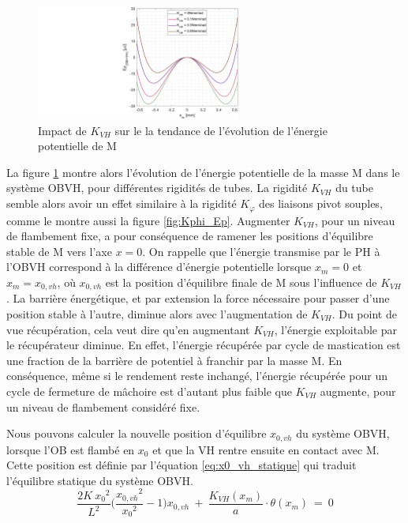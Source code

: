 \begin{figure}[!htb]
	\begin{center}
		\captionsetup{justification=centering}
		\includegraphics[trim={14cm 0cm 0cm 0cm},clip,width=0.6\textwidth]{../Chap5/Figure/(Ep)_vs_(x_m)_avec_plusieurs_K_VH.pdf}
		\caption{Impact de $K_{VH}$ sur le la tendance de l'évolution de l'énergie potentielle de M}
		\label{fig:(Ep)_vs_(x_m)_avec_plusieurs_K_VH}
	\end{center}
\end{figure}  
La figure \ref{fig:(Ep)_vs_(x_m)_avec_plusieurs_K_VH} montre alors l'évolution de l'énergie potentielle de la masse M dans le système OBVH, pour différentes rigidités de tubes. La rigidité $K_{VH}$ du tube semble alors avoir un effet similaire à la rigidité $K_{\varphi}$ des liaisons pivot souples, comme le montre aussi la figure \ref{fig:Kphi_Ep}. Augmenter $K_{VH}$, pour un niveau de flambement fixe, a pour conséquence de ramener les positions d'équilibre stable de M vers l'axe $x=0$. On rappelle que l'énergie transmise par le PH à l'OBVH correspond à la différence d'énergie potentielle lorsque $x_m=0$ et $x_m=x_{0,vh}$, où $x_{0,vh}$ est la position d'équilibre finale de M sous l'influence de $K_{VH}$. La barrière énergétique, et par extension la force nécessaire pour passer d'une position stable à l'autre, diminue alors avec l'augmentation de $K_{VH}$. Du point de vue récupération, cela veut dire qu'en augmentant $K_{VH}$, l'énergie exploitable par le récupérateur diminue. En effet, l'énergie récupérée par cycle de mastication est une fraction de la barrière de potentiel à franchir par la masse M. En conséquence, même si le rendement reste inchangé, l'énergie récupérée pour un cycle de fermeture de mâchoire est d'autant plus faible que $K_{VH}$ augmente, pour un niveau de flambement considéré fixe.

Nous pouvons calculer la nouvelle position d'équilibre $x_{0,vh}$ du système OBVH, lorsque l'OB est flambé en $x_0$ et que la VH rentre ensuite en contact avec M. Cette position est définie par l'équation \ref{eq:x0_vh_statique} qui traduit l'équilibre statique du système OBVH.
\begin{equation}
\frac{2K\ {x_{0}}^2}{L^2}\biggl(\frac{{x_{0,vh}}^2}{{x_{0}}^2}-1\biggr)x_{0,vh}
\ +\ \frac{K_{VH}(x_m)}{a}\cdot \theta({x_m})
\ =\ 0 
\label{eq:x0_vh_statique}
\end{equation}

